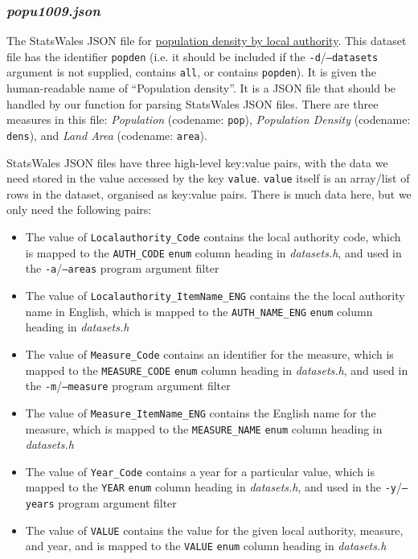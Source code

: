 \documentclass[a4paper]{article}
\begin{document}
\subsubsection*{\emph{popu1009.json}}\label{sec:cwk datasets popu1009}
The StatsWales JSON file for \href{http://open.statswales.gov.wales/en-gb/dataset/popu1009}{population density by local authority}. This dataset file has the identifier \texttt{popden} (i.e. it should be included if the \texttt{-d}/\texttt{--datasets} argument is not supplied, contains \texttt{all}, or contains \texttt{popden}). It is given the human-readable name of ``Population density''. It is a JSON file that should be handled by our function for parsing StatsWales JSON files.  There are three measures in this file: \emph{Population} (codename: \texttt{pop}), \emph{Population Density} (codename: \texttt{dens}), and \emph{Land Area} (codename: \texttt{area}).

StatsWales JSON files have three high-level key:value pairs, with the data we need stored in the value accessed by the key \texttt{value}. \texttt{value} itself is an array/list of rows in the dataset, organised as key:value pairs. There is much data here, but we only need the following pairs:

\begin{itemize}
    \item The value of \texttt{Localauthority\_Code} contains the local authority code, which is mapped to the \texttt{AUTH\_CODE} \texttt{enum} column heading in \emph{datasets.h}, and used in the \texttt{-a}/\texttt{--areas} program argument filter

    \item The value of \texttt{Localauthority\_ItemName\_ENG} contains the the local authority name in English, which is mapped to the \texttt{AUTH\_NAME\_ENG} \texttt{enum} column heading in \emph{datasets.h}

    \item The value of \texttt{Measure\_Code} contains an identifier for the measure, which is mapped to the \texttt{MEASURE\_CODE} \texttt{enum} column heading in \emph{datasets.h}, and used in the \texttt{-m}/\texttt{--measure} program argument filter

    \item The value of \texttt{Measure\_ItemName\_ENG} contains the English name for the measure, which is mapped to the \texttt{MEASURE\_NAME} \texttt{enum} column heading in \emph{datasets.h}

    \item The value of \texttt{Year\_Code} contains a year for a particular value, which is mapped to the \texttt{YEAR} \texttt{enum} column heading in \emph{datasets.h}, and used in the \texttt{-y}/\texttt{--years} program argument filter

    \item The value of \texttt{VALUE} contains the value for the given local authority, measure, and year, and is mapped to the \texttt{VALUE} \texttt{enum} column heading in \emph{datasets.h}
\end{itemize}
\end{document}
